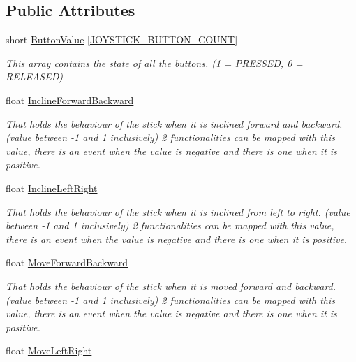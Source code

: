 \subsection*{Public Attributes}
\begin{DoxyCompactItemize}
\item 
short \hyperlink{structJoystickCommand_abe14f0b7b117048aa1c7f9626a669035}{Button\+Value} \mbox{[}\hyperlink{KinovaTypes_8h_a3792c81f5808ad4f30000689ee0f0d07}{J\+O\+Y\+S\+T\+I\+C\+K\+\_\+\+B\+U\+T\+T\+O\+N\+\_\+\+C\+O\+U\+NT}\mbox{]}
\begin{DoxyCompactList}\small\item\em This array contains the state of all the buttons. (1 = P\+R\+E\+S\+S\+ED, 0 = R\+E\+L\+E\+A\+S\+ED) \end{DoxyCompactList}\item 
float \hyperlink{structJoystickCommand_ac1ac2e83b68ea20eba3e92935b966ba6}{Incline\+Forward\+Backward}
\begin{DoxyCompactList}\small\item\em That holds the behaviour of the stick when it is inclined forward and backward. (value between -\/1 and 1 inclusively) 2 functionalities can be mapped with this value, there is an event when the value is negative and there is one when it is positive. \end{DoxyCompactList}\item 
float \hyperlink{structJoystickCommand_a357b7ffd95720084658487aee12662c8}{Incline\+Left\+Right}
\begin{DoxyCompactList}\small\item\em That holds the behaviour of the stick when it is inclined from left to right. (value between -\/1 and 1 inclusively) 2 functionalities can be mapped with this value, there is an event when the value is negative and there is one when it is positive. \end{DoxyCompactList}\item 
float \hyperlink{structJoystickCommand_a9ca8ffe74ba1717de22528f71b0e5592}{Move\+Forward\+Backward}
\begin{DoxyCompactList}\small\item\em That holds the behaviour of the stick when it is moved forward and backward. (value between -\/1 and 1 inclusively) 2 functionalities can be mapped with this value, there is an event when the value is negative and there is one when it is positive. \end{DoxyCompactList}\item 
float \hyperlink{structJoystickCommand_a6ca311d7940ce3c7ea6e9a3719388181}{Move\+Left\+Right}

\end{DoxyCompactItemize}
